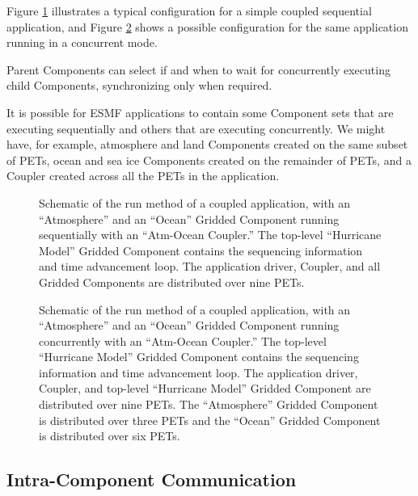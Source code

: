 Figure \ref{fig:serial} illustrates a typical configuration for 
a simple coupled sequential
application, and Figure \ref{fig:concurrent} shows a possible 
configuration for the same application running in a concurrent mode.

Parent Components can select if and when to wait for concurrently
executing child Components, synchronizing only when required.

It is possible for ESMF applications to contain some Component sets
that are executing sequentially and others that are executing concurrently.
We might have, for example, atmosphere and land Components created
on the same subset of PETs, ocean and sea ice Components created on
the remainder of PETs, and a Coupler created across all the PETs in
the application.

\begin{center}
\begin{figure}
\caption{Schematic of the run method of a coupled application, with an
``Atmosphere'' and an ``Ocean'' Gridded Component running sequentially with 
an ``Atm-Ocean Coupler.''  The top-level ``Hurricane Model'' 
Gridded Component contains the sequencing information and time 
advancement loop.  The application driver, Coupler, and all Gridded Components 
are distributed over nine PETs.}
\label{fig:serial}
\end{figure}
\end{center}

\begin{center}
\begin{figure}
\caption{Schematic of the run method of a coupled application, with an
``Atmosphere'' and an ``Ocean'' Gridded Component running concurrently with 
an ``Atm-Ocean Coupler.''  The top-level ``Hurricane Model'' 
Gridded Component contains the sequencing information and time 
advancement loop.  The application driver, Coupler, and top-level ``Hurricane
Model'' Gridded Component are distributed over nine PETs.  The
``Atmosphere'' Gridded Component is distributed over three PETs and
the ``Ocean'' Gridded Component is distributed over six PETs.}
\label{fig:concurrent}
\end{figure}
\end{center}

\subsection{Intra-Component Communication}
\label{sec:localcomm}

